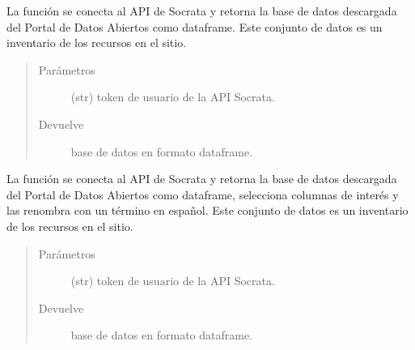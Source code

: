 \documentclass[letterpaper,10pt,openany,spanish]{sphinxmanual}
\begin{document}
\label{\detokenize{metadatos:module-metadatos}}

\begin{fulllineitems}
\label{\detokenize{metadatos:metadatos.asset_inventory}}
La función se conecta al API de Socrata y retorna la base de datos  descargada del Portal de Datos Abiertos
como dataframe. Este conjunto de datos es un inventario de los recursos en el sitio.
\begin{quote}\begin{description}
\item[{Parámetros}] \leavevmode
{} \textendash{} (str)  \sphinxhyphen{} token de usuario de la API Socrata.

\item[{Devuelve}] \leavevmode
base de datos en formato dataframe.

\end{description}\end{quote}

\end{fulllineitems}


\begin{fulllineitems}
\label{\detokenize{metadatos:metadatos.asset_pretty}}
La función se conecta al API de Socrata y retorna la base de datos  descargada del Portal de Datos Abiertos
como dataframe, selecciona columnas de interés y las renombra con un término en español. Este conjunto de datos es un inventario de los recursos en el sitio.
\begin{quote}\begin{description}
\item[{Parámetros}] \leavevmode
{} \textendash{} (str)  \sphinxhyphen{} token de usuario de la API Socrata.

\item[{Devuelve}] \leavevmode
base de datos en formato dataframe.

\end{description}\end{quote}

\end{fulllineitems}
\end{document}
